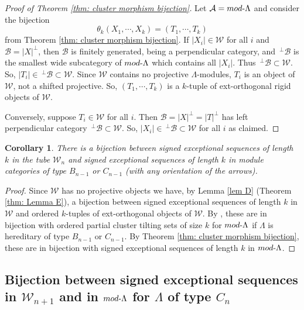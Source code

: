 \documentclass[11pt]{amsart}
\newtheorem{cor}[thm]{Corollary}
\theoremstyle{definition}
\theoremstyle{remark}
\numberwithin{equation}{section}
\newcommand{\cA}{\ensuremath{{\mathcal{A}}}}
\newcommand{\cB}{\ensuremath{{\mathcal{B}}}}
\newcommand{\cW}{\ensuremath{{\mathcal{W}}}}
\begin{document}
\begin{proof}[Proof of Theorem \ref{thm: cluster morphism bijection}]
Let $\cA=mod\text-\Lambda$ and consider the bijection
\[
	\theta_k(X_1,\cdots,X_k)=(T_1,\cdots,T_k)
\]
from Theorem \ref{thm: cluster morphism bijection}. If $|X_i|\in \cW$ for all $i$ and $\cB=|X|^\perp$, then $\cB$ is finitely generated, being a perpendicular category, and $\,^\perp \cB$ is the smallest wide subcategory of $mod\text-\Lambda$ which contains all $|X_i|$. Thus $\,^\perp \cB\subset\cW$. So, $|T_i|\in \,^\perp\cB\subset \cW$. Since $\cW$ contains no projective $\Lambda$-modules, $T_i$ is an object of $\cW$, not a shifted projective. So, $(T_1,\cdots,T_k)$ is a $k$-tuple of ext-orthogonal rigid objects of $\cW$.

Conversely, suppose $T_i\in \cW$ for all $i$. Then $\cB=|X|^\perp=|T|^\perp$ has left perpendicular category $\,^\perp\cB\subset \cW$. So, $|X_i|\in \,^\perp\cB\subset\cW$ for all $i$ as claimed.
\end{proof}

\begin{cor}\label{cor: thm D}
There is a bijection between signed exceptional sequences of length $k$ in the tube $\cW_n$ and signed exceptional sequences of length $k$ in module categories of type $B_{n-1}$ or $C_{n-1}$ (with any orientation of the arrows).
\end{cor}

\begin{proof}Since $\cW$ has no projective objects we have, by Lemma \ref{lem D} (Theorem \ref{thm: Lemma E}), a bijection between signed exceptional sequences of length $k$ in $\cW$ and ordered $k$-tuples of ext-orthogonal objects of $\cW$. By \cite{BMV}, these are in bijection with ordered partial cluster tilting sets of size $k$ for $mod\text-\Lambda$ if $\Lambda$ is hereditary of type $B_{n-1}$ or $C_{n-1}$. By Theorem \ref{thm: cluster morphism bijection}, these are in bijection with signed exceptional sequences of length $k$ in $mod\text-\Lambda$.
\end{proof}


\subsection{Bijection between signed exceptional sequences in $\cW_{n+1}$ and in $mod\text-\Lambda$ for $\Lambda$ of type $C_{n}$}\label{ss: bijection signed exc seq Wn and Cn-1}
\end{document}

